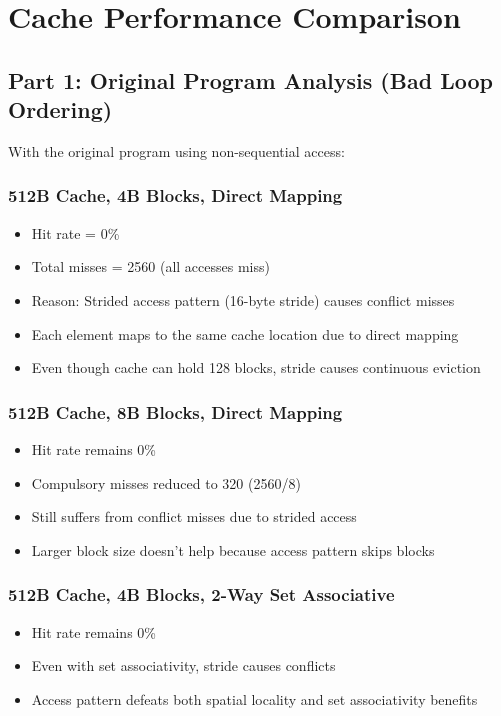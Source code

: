 \documentclass{article}
\begin{document}
\section{Cache Performance Comparison}

\subsection{Part 1: Original Program Analysis (Bad Loop Ordering)}
With the original program using non-sequential access:

\subsubsection{512B Cache, 4B Blocks, Direct Mapping}
\begin{itemize}
    \item Hit rate = 0\%
    \item Total misses = 2560 (all accesses miss)
    \item Reason: Strided access pattern (16-byte stride) causes conflict misses
    \item Each element maps to the same cache location due to direct mapping
    \item Even though cache can hold 128 blocks, stride causes continuous eviction
\end{itemize}

\subsubsection{512B Cache, 8B Blocks, Direct Mapping}
\begin{itemize}
    \item Hit rate remains 0\%
    \item Compulsory misses reduced to 320 (2560/8)
    \item Still suffers from conflict misses due to strided access
    \item Larger block size doesn't help because access pattern skips blocks
\end{itemize}

\subsubsection{512B Cache, 4B Blocks, 2-Way Set Associative}
\begin{itemize}
    \item Hit rate remains 0\%
    \item Even with set associativity, stride causes conflicts
    \item Access pattern defeats both spatial locality and set associativity benefits
\end{itemize}
\end{document}

